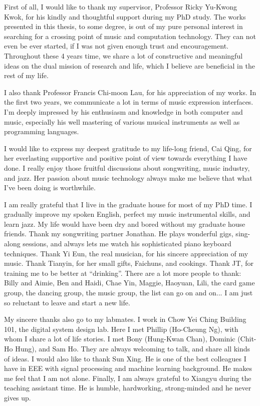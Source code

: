 \begin{acknowledgements}

First of all, I would like to thank my supervisor, Professor Ricky Yu-Kwong Kwok, for his kindly and thoughtful support during my PhD study. The works presented in this thesis, to some degree, is out of my pure personal interest in searching for a crossing point of music and computation technology. They can not even be ever started, if I was not given enough trust and encouragement. Throughout these 4 years time, we share a lot of constructive and meaningful ideas on the dual mission of research and life, which I believe are beneficial in the rest of my life.

I also thank Professor Francis Chi-moon Lau, for his appreciation of my works. In the first two years, we communicate a lot in terms of music expression interfaces. I'm deeply impressed by his enthusiasm and knowledge in both computer and music, especially his well mastering of various musical instruments as well as programming languages.

I would like to express my deepest gratitude to my life-long friend, Cai Qing, for her everlasting supportive and positive point of view towards everything I have done. I really enjoy those fruitful discussions about songwriting, music industry, and jazz. Her passion about music technology always make me believe that what I've been doing is worthwhile.

I am really grateful that I live in the graduate house for most of my PhD time. I gradually improve my spoken English, perfect my music instrumental skills, and learn jazz. My life would have been dry and bored without my graduate house friends. Thank my songwriting partner Jonathan. He plays wonderful gigs, sing-along sessions, and always lets me watch his sophisticated piano keyboard techniques. Thank Yi Eun, the real musician, for his sincere appreciation of my music. Thank Tianyin, for her small gifts, Faichuns, and cookings. Thank JT, for training me to be better at ``drinking''. There are a lot more people to thank: Billy and Aimie, Ben and Haidi, Chae Yin, Maggie, Haoyuan, Lili, the card game group, the dancing group, the music group, the list can go on and on... I am just so reluctant to leave and start a new life.

My sincere thanks also go to my labmates. I work in Chow Yei Ching Building 101, the digital system design lab. Here I met Phillip (Ho-Cheung Ng), with whom I share a lot of life stories. I met Bony (Hung-Kwan Chan), Dominic (Chit-Ho Hung), and Sam Ho. They are always welcoming to talk, and share all kinds of ideas. I would also like to thank Sun Xing. He is one of the best colleagues I have in EEE with signal processing and machine learning background. He makes me feel that I am not alone. Finally, I am always grateful to Xiangyu during the teaching assistant time. He is humble, hardworking, strong-minded and he never gives up.


\end{acknowledgements}

